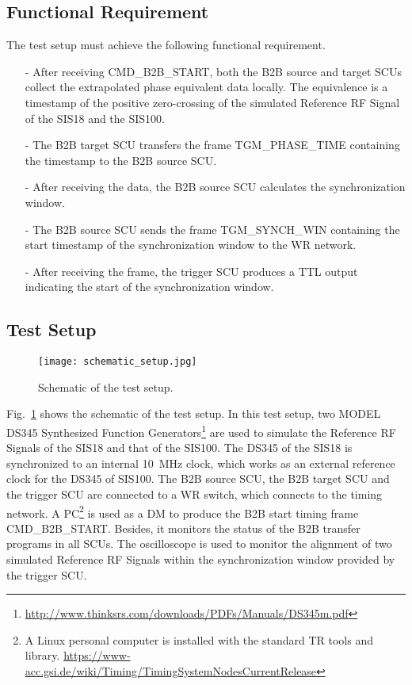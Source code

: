 \subsection{Functional Requirement}
The test setup must achieve the following functional requirement.
\begin{itemize}
\item[-] After receiving CMD\_B2B\_START, both the B2B source and target SCUs collect the extrapolated phase equivalent data locally. The equivalence is a timestamp of the positive zero-crossing of the simulated Reference RF Signal of the SIS18 and the SIS100. 
\item[-] The B2B target SCU transfers the frame TGM\_PHASE\_TIME containing the timestamp to the B2B source SCU.
\item[-] After receiving the data, the B2B source SCU calculates the synchronization window.
\item[-] The B2B source SCU sends the frame TGM\_SYNCH\_WIN containing the start timestamp of the synchronization window to the WR network.
\item[-] After receiving the frame, the trigger SCU produces a TTL output indicating the start of the synchronization window. 
\end{itemize}

\subsection{Test Setup}

\begin{figure}[H]
   \centering   
   \texttt{[image: schematic\_setup.jpg]}
   \caption{Schematic of the test setup.}
   \label{setup}
\end{figure}

Fig.~\ref{setup} shows the schematic of the test setup. In this test setup, two MODEL DS345 Synthesized Function Generators\footnote{\url{http://www.thinksrs.com/downloads/PDFs/Manuals/DS345m.pdf}} are used to simulate the Reference RF Signals of the SIS18 and that of the SIS100. The DS345 of the SIS18 is synchronized to an internal \SI{10}{\MHz} clock, which works as an external reference clock for the DS345 of SIS100. The B2B source SCU, the B2B target SCU and the trigger SCU are connected to a WR switch, which connects to the timing network. A \gls{PC}\footnote{A Linux personal computer is installed with the standard TR tools and library. \newline\url{https://www-acc.gsi.de/wiki/Timing/TimingSystemNodesCurrentRelease}} is used as a DM to produce the B2B start timing frame CMD\_B2B\_START. Besides, it monitors the status of the B2B transfer programs in all SCUs. The oscilloscope is used to monitor the alignment of two simulated Reference RF Signals within the synchronization window provided by the trigger SCU.   


